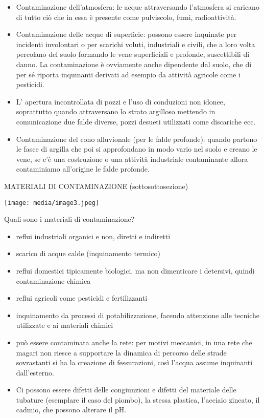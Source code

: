 \documentclass[]{article}
\begin{document}
\begin{itemize}
\item
  Contaminazione dell'atmosfera: le acque attraversando l'atmosfera si
  caricano di tutto ciò che in essa è presente come pulviscolo, fumi,
  radioattività.
\item
  Contaminazione delle acque di superficie: possono essere inquinate per
  incidenti involontari o per scarichi voluti, industriali e civili, che
  a loro volta percolano del suolo formando le vene superficiali e
  profonde, suscettibili di danno. La contaminazione è ovviamente anche
  dipendente dal suolo, che di per sé riporta inquinanti derivati ad
  esempio da attività agricole come i pesticidi.
\item
  L' apertura incontrollata di pozzi e l'uso di conduzioni non idonee,
  soprattutto quando attraversano lo strato argilloso mettendo in
  comunicazione due falde diverse, pozzi desueti utilizzati come
  discariche ecc.
\item
  Contaminazione del cono alluvionale (per le falde profonde): quando
  partono le fasce di argilla che poi si approfondano in modo vario nel
  suolo e creano le vene, se c'è una costruzione o una attività
  industriale contaminante allora contaminiamo all'origine le falde
  profonde.
\end{itemize}

MATERIALI DI CONTAMINAZIONE (sottosottosezione)

\texttt{[image: media/image3.jpeg]}

Quali sono i materiali di contaminazione?

\begin{itemize}
\item
  reflui industriali organici e non, diretti e indiretti
\item
  scarico di acque calde (inquinamento termico)
\item
  reflui domestici tipicamente biologici, ma non dimenticare i
  detersivi, quindi contaminazione chimica
\item
  reflui agricoli come pesticidi e fertilizzanti
\item
  inquinamento da processi di potabilizzazione, facendo attenzione alle
  tecniche utilizzate e ai materiali chimici
\item
  può essere contaminata anche la rete: per motivi meccanici, in una
  rete che magari non riesce a supportare la dinamica di percorso delle
  strade sovrastanti si ha la creazione di fessurazioni, così l'acqua
  assume inquinanti dall'esterno.
\item
  Ci possono essere difetti delle congiunzioni e difetti del materiale
  delle tubature (esemplare il caso del piombo), la stessa plastica,
  l'acciaio zincato, il cadmio, che possono alterare il pH.
\end{itemize}
\end{document}
